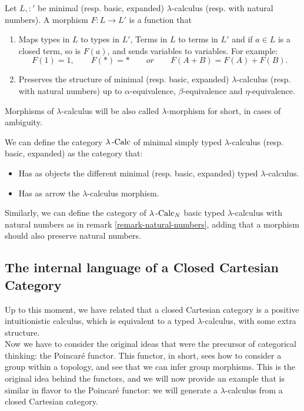 \begin{definition}
  Let $L, : '$ be minimal (resp. basic, expanded) $\lambda$-calculus (resp. with natural numbers). A morphism $F: L \to L '$ is a function that
  \begin{enumerate}
  \item Maps types in $ L$ to types in $L '$, Terms in $L$ to terms in $L '$ and if $a\in L$ is a closed term, so is $F(a)$, and sends variables to variables. For example: $$F(1) = 1, \qquad F(*) = * \qquad or \qquad F(A+B) =F(A)+F(B).$$
    
  \item Preserves the structure of minimal (resp. basic, expanded) $\lambda$-calculus (resp. with natural numbers) up to $\alpha$-equivalence, $\beta$-equivalence and $\eta$-equivalence. 

  \end{enumerate}

  Morphisms of $\lambda$-calculus will be also called $\lambda$-morphism for short, in cases of ambiguity.
\end{definition}


\begin{definition}
  We can define the category $\lambda\operatorname{-Calc}$ of minimal simply typed $\lambda$-calculus (resp. basic, expanded)  as the category that:
  \begin{itemize}
  \item Has as objects the different minimal (resp. basic, expanded) typed $\lambda$-calculus.
  \item Has as arrow the $\lambda$-calculus morphism.
  \end{itemize}
  Similarly, we can define the category of $\lambda\operatorname{-Calc}_N$ basic typed $\lambda$-calculus with natural numbers as in remark \ref{remark-natural-numbers}, adding that a morphism should also preserve natural numbers.
\end{definition}

\subsection{The internal language of a Closed Cartesian Category}

Up to this moment, we have related that a closed Cartesian category is a positive intuitionistic calculus, which is equivalent to a typed $\lambda$-calculus, with some extra structure.\\

Now we have to consider the original ideas that were the precursor of categorical thinking: the Poincaré functor. This functor, in short,  sees how to consider a group within a topology, and see that we can infer group morphisms. This is the original idea behind the functors, and we will now provide an example that is similar in flavor to the Poincaré functor: we will generate a $\lambda$-calculus from a closed Cartesian category.\\ 



